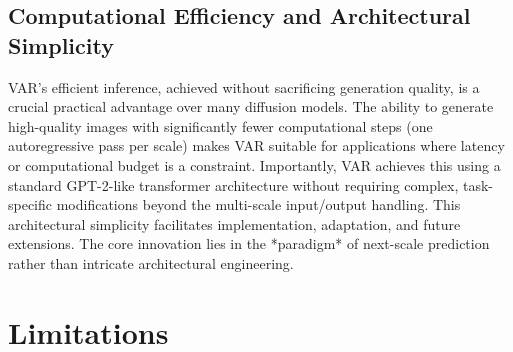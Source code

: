 \documentclass{article}
\begin{document}
\subsection{Computational Efficiency and Architectural Simplicity}
VAR's efficient inference, achieved without sacrificing generation quality, is a crucial practical advantage over many diffusion models. The ability to generate high-quality images with significantly fewer computational steps (one autoregressive pass per scale) makes VAR suitable for applications where latency or computational budget is a constraint. Importantly, VAR achieves this using a standard GPT-2-like transformer architecture without requiring complex, task-specific modifications beyond the multi-scale input/output handling. This architectural simplicity facilitates implementation, adaptation, and future extensions. The core innovation lies in the *paradigm* of next-scale prediction rather than intricate architectural engineering.

\section{Limitations}
\label{sec:limitations}
\end{document}
